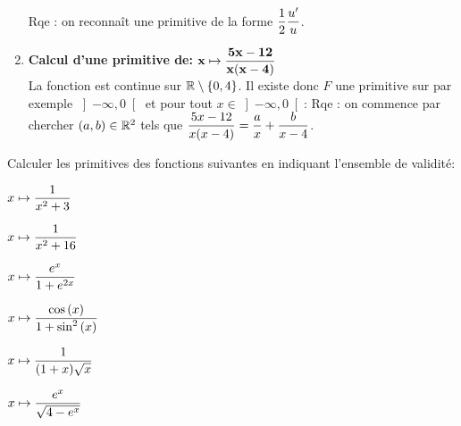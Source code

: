 \documentclass[a4paper, 11pt,reqno]{article}
\begin{document}
\begin{correction}
\begin{enumerate}
        Rqe : on reconna\^{i}t une primitive de la forme $\displaystyle\frac{1}{2}\displaystyle\frac{u^{\prime}}{u}$.
		\item \textbf{Calcul d'une primitive de: $\mathbf{x\mapsto \displaystyle\frac{ 5x-12 }{ x(x-4)  }}$}\\
		      \noindent La fonction est continue sur $\mathbb{R}\setminus\left\lbrace 0,4   \right\rbrace$. Il existe donc $F$ une primitive sur par exemple $\left\rbrack -\infty,0\right\lbrack$ et pour tout $x\in\left\rbrack -\infty,0\right\lbrack$:  
        Rqe : on commence par chercher $(a,b) \in \mathbb{R}^2$ tels que $ \displaystyle\frac{ 5x-12 }{ x(x-4)  } = \frac{a}{x} + \frac{b}{x-4}$.
	\end{enumerate}
\end{correction}
\begin{exercice}  \;
	Calculer les primitives des fonctions suivantes en indiquant l'ensemble de validit\'e:
	\begin{enumerate}
		\begin{minipage}[t]{0.3\textwidth}
			\item $x\mapsto \displaystyle\frac{1}{x^2+3}$
			\item $x\mapsto \displaystyle\frac{1}{x^2+16 }$
		\end{minipage}
		\begin{minipage}[t]{0.3\textwidth}
			\item $x\mapsto \displaystyle\frac{e^x}{1+e^{2x}}$
			\item $x\mapsto \displaystyle\frac{\cos{(x)}}{ 1+\sin^2{(x)}}$
		\end{minipage}
		\begin{minipage}[t]{0.3\textwidth}
			\item $x\mapsto \displaystyle\frac{1}{(1+x)\sqrt{x}}$
			\item $x\mapsto \displaystyle\frac{ e^x }{\sqrt{ 4-e^x}  }$
		\end{minipage}

	\end{enumerate}
\end{exercice}
\end{document}
